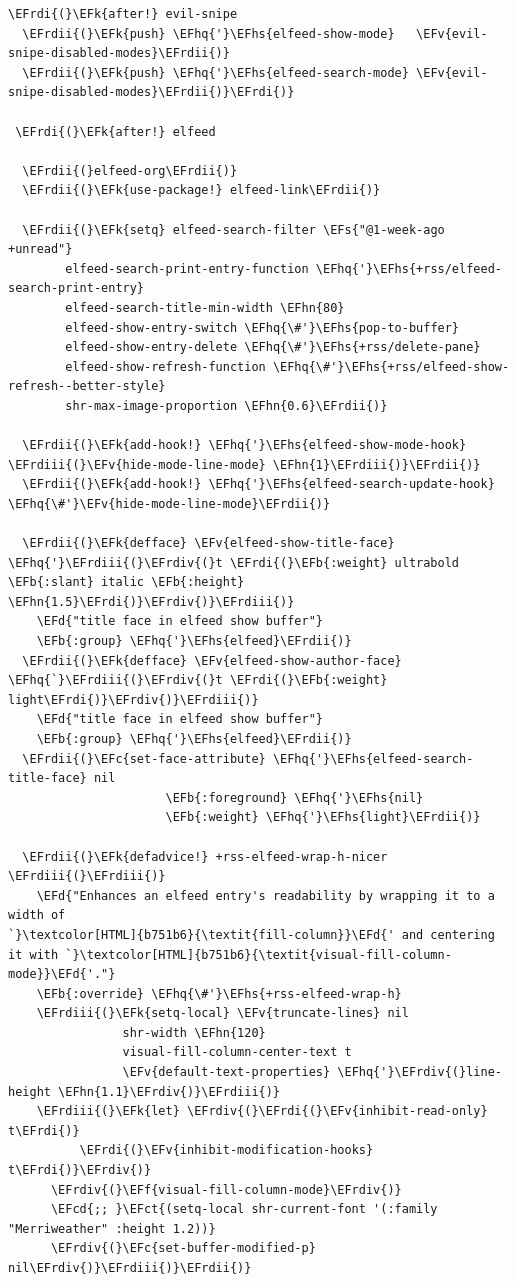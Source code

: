 \documentclass{scrartcl}
\newcommand{\EFk}[1]{\textcolor{EFk}{#1}} %
\newcommand{\EFd}[1]{\textcolor{EFd}{\textit{#1}}} %
\newcommand{\EFs}[1]{\textcolor{EFs}{#1}} %
\newcommand{\EFb}[1]{\textcolor{EFb}{#1}} %
\newcommand{\EFct}[1]{\textcolor{EFct}{#1}} %
\newcommand{\EFc}[1]{\textcolor{EFc}{#1}} %
\newcommand{\EFv}[1]{\textcolor{EFv}{#1}} %
\newcommand{\EFf}[1]{\textcolor{EFf}{#1}} %
\newcommand{\EFcd}[1]{\textcolor{EFcd}{#1}} %
\newcommand{\EFhn}[1]{\textcolor{EFhn}{\textbf{#1}}} %
\newcommand{\EFhq}[1]{\textcolor{EFhq}{#1}} %
\newcommand{\EFhs}[1]{\textcolor{EFhs}{#1}} %
\newcommand{\EFrdi}[1]{\textcolor{EFrdi}{#1}} %
\newcommand{\EFrdii}[1]{\textcolor{EFrdii}{#1}} %
\newcommand{\EFrdiii}[1]{\textcolor{EFrdiii}{#1}} %
\newcommand{\EFrdiv}[1]{\textcolor{EFrdiv}{#1}} %
\begin{document}
\begin{Code}
\begin{Verbatim}[]
\EFrdi{(}\EFk{after!} evil-snipe
  \EFrdii{(}\EFk{push} \EFhq{'}\EFhs{elfeed-show-mode}   \EFv{evil-snipe-disabled-modes}\EFrdii{)}
  \EFrdii{(}\EFk{push} \EFhq{'}\EFhs{elfeed-search-mode} \EFv{evil-snipe-disabled-modes}\EFrdii{)}\EFrdi{)}

 \EFrdi{(}\EFk{after!} elfeed

  \EFrdii{(}elfeed-org\EFrdii{)}
  \EFrdii{(}\EFk{use-package!} elfeed-link\EFrdii{)}

  \EFrdii{(}\EFk{setq} elfeed-search-filter \EFs{"@1-week-ago +unread"}
        elfeed-search-print-entry-function \EFhq{'}\EFhs{+rss/elfeed-search-print-entry}
        elfeed-search-title-min-width \EFhn{80}
        elfeed-show-entry-switch \EFhq{\#'}\EFhs{pop-to-buffer}
        elfeed-show-entry-delete \EFhq{\#'}\EFhs{+rss/delete-pane}
        elfeed-show-refresh-function \EFhq{\#'}\EFhs{+rss/elfeed-show-refresh--better-style}
        shr-max-image-proportion \EFhn{0.6}\EFrdii{)}

  \EFrdii{(}\EFk{add-hook!} \EFhq{'}\EFhs{elfeed-show-mode-hook} \EFrdiii{(}\EFv{hide-mode-line-mode} \EFhn{1}\EFrdiii{)}\EFrdii{)}
  \EFrdii{(}\EFk{add-hook!} \EFhq{'}\EFhs{elfeed-search-update-hook} \EFhq{\#'}\EFv{hide-mode-line-mode}\EFrdii{)}

  \EFrdii{(}\EFk{defface} \EFv{elfeed-show-title-face} \EFhq{'}\EFrdiii{(}\EFrdiv{(}t \EFrdi{(}\EFb{:weight} ultrabold \EFb{:slant} italic \EFb{:height} \EFhn{1.5}\EFrdi{)}\EFrdiv{)}\EFrdiii{)}
    \EFd{"title face in elfeed show buffer"}
    \EFb{:group} \EFhq{'}\EFhs{elfeed}\EFrdii{)}
  \EFrdii{(}\EFk{defface} \EFv{elfeed-show-author-face} \EFhq{`}\EFrdiii{(}\EFrdiv{(}t \EFrdi{(}\EFb{:weight} light\EFrdi{)}\EFrdiv{)}\EFrdiii{)}
    \EFd{"title face in elfeed show buffer"}
    \EFb{:group} \EFhq{'}\EFhs{elfeed}\EFrdii{)}
  \EFrdii{(}\EFc{set-face-attribute} \EFhq{'}\EFhs{elfeed-search-title-face} nil
                      \EFb{:foreground} \EFhq{'}\EFhs{nil}
                      \EFb{:weight} \EFhq{'}\EFhs{light}\EFrdii{)}

  \EFrdii{(}\EFk{defadvice!} +rss-elfeed-wrap-h-nicer \EFrdiii{(}\EFrdiii{)}
    \EFd{"Enhances an elfeed entry's readability by wrapping it to a width of
`}\textcolor[HTML]{b751b6}{\textit{fill-column}}\EFd{' and centering it with `}\textcolor[HTML]{b751b6}{\textit{visual-fill-column-mode}}\EFd{'."}
    \EFb{:override} \EFhq{\#'}\EFhs{+rss-elfeed-wrap-h}
    \EFrdiii{(}\EFk{setq-local} \EFv{truncate-lines} nil
                shr-width \EFhn{120}
                visual-fill-column-center-text t
                \EFv{default-text-properties} \EFhq{'}\EFrdiv{(}line-height \EFhn{1.1}\EFrdiv{)}\EFrdiii{)}
    \EFrdiii{(}\EFk{let} \EFrdiv{(}\EFrdi{(}\EFv{inhibit-read-only} t\EFrdi{)}
          \EFrdi{(}\EFv{inhibit-modification-hooks} t\EFrdi{)}\EFrdiv{)}
      \EFrdiv{(}\EFf{visual-fill-column-mode}\EFrdiv{)}
      \EFcd{;; }\EFct{(setq-local shr-current-font '(:family "Merriweather" :height 1.2))}
      \EFrdiv{(}\EFc{set-buffer-modified-p} nil\EFrdiv{)}\EFrdiii{)}\EFrdii{)}


\end{Verbatim}
\end{Code}
\end{document}
